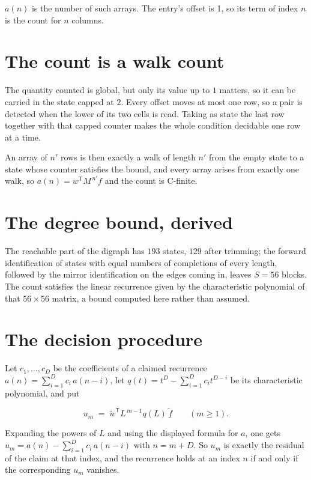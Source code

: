 \documentclass[11pt]{article}
\theoremstyle{definition}
\begin{document}
$a(n)$ is the number of such arrays. The entry's offset is 1, so its term of index $n$ is the count for $n$ columns.

\section{The count is a walk count}

The quantity counted is global, but only its value up to $1$ matters, so it can be carried in the state capped at $2$. Every offset moves at most one row, so a pair is detected when the lower of its two cells is read. Taking as state the last row together with that capped counter makes the whole condition decidable one row at a time.

An array of $n'$ rows is then exactly a walk of length $n'$ from the empty state to a state whose counter satisfies the bound, and every array arises from exactly one walk, so $a(n) = w^{\mathsf T}M^{\,n'}f$ and the count is C-finite.

\section{The degree bound, derived}

The reachable part of the digraph has $193$ states, $129$ after trimming; the forward identification of states with equal numbers of completions of every length, followed by the mirror identification on the edges coming in, leaves $S = 56$ blocks. The count satisfies the linear recurrence given by the characteristic polynomial of that $56\times56$ matrix, a bound computed here rather than assumed.

\section{The decision procedure}

Let $c_1,\dots,c_D$ be the coefficients of a claimed recurrence $a(n) = \sum_{i=1}^{D} c_i\,a(n-i)$, let $q(t) = t^{D} - \sum_{i=1}^{D} c_i t^{D-i}$ be its characteristic polynomial, and put

\[u_m \;=\; \tilde w^{\mathsf T} L^{\,m-1} q(L)\,\tilde f \qquad (m \ge 1).\]

Expanding the powers of $L$ and using the displayed formula for $a$, one gets $u_m = a(n) - \sum_{i=1}^{D} c_i\,a(n-i)$ with $n = m + D$. So $u_m$ is exactly the residual of the claim at that index, and the recurrence holds at an index $n$ if and only if the corresponding $u_m$ vanishes.
\end{document}

